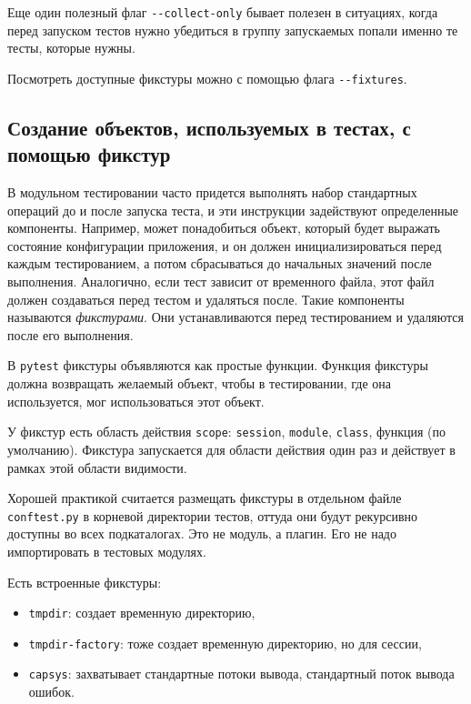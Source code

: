 \documentclass[%
	11pt,
	a4paper,
	utf8,
		]{article}
\begin{document}
Еще один полезный флаг \verb|--collect-only| бывает полезен в ситуациях, когда перед запуском тестов нужно убедиться в группу запускаемых попали именно те тесты, которые нужны.

Посмотреть доступные фикстуры можно с помощью флага \verb|--fixtures|.

\subsection{Создание объектов, используемых в тестах, с помощью фикстур}

В модульном тестировании часто придется выполнять набор стандартных операций до и после запуска теста, и эти инструкции задействуют определенные компоненты. Например, может понадобиться объект, который будет выражать состояние конфигурации приложения, и он должен инициализироваться перед каждым тестированием, а потом сбрасываться до начальных значений после выполнения. Аналогично, если тест зависит от временного файла, этот файл должен создаваться перед тестом и удаляться после. Такие компоненты называются \emph{фикстурами}. Они устанавливаются перед тестированием и удаляются после его выполнения.

В \texttt{pytest} фикстуры объявляются как простые функции. Функция фикстуры должна возвращать желаемый объект, чтобы в тестировании, где она используется, мог использоваться этот объект.

У фикстур есть область действия \texttt{scope}: \texttt{session}, \texttt{module}, \texttt{class}, функция (по умолчанию). Фикстура запускается для области действия один раз и действует в рамках этой области видимости.

Хорошей практикой считается размещать фикстуры в отдельном файле \texttt{conftest.py} в корневой директории тестов, оттуда они будут рекурсивно доступны во всех подкаталогах. Это не модуль, а плагин. Его не надо импортировать в тестовых модулях.

Есть встроенные фикстуры:
\begin{itemize}
	\item \texttt{tmpdir}: создает временную директорию,
	
	\item \texttt{tmpdir-factory}: тоже создает временную директорию, но для сессии,
	
	\item \texttt{capsys}: захватывает стандартные потоки вывода, стандартный поток вывода ошибок.
\end{itemize}
\end{document}
